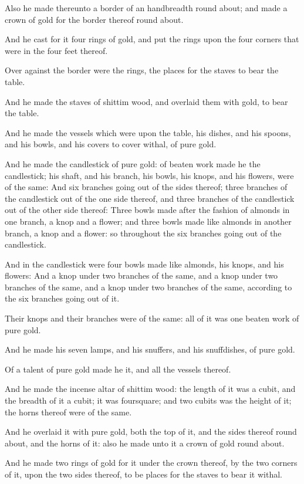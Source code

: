 \verse Also he made thereunto a border of an handbreadth round about; and made a crown of gold for the border thereof round about.

\verse And he cast for it four rings of gold, and put the rings upon the four corners that were in the four feet thereof.

\verse Over against the border were the rings, the places for the staves to bear the table.

\verse And he made the staves of shittim wood, and overlaid them with gold, to bear the table.

\verse And he made the vessels which were upon the table, his dishes, and his spoons, and his bowls, and his covers to cover withal, of pure gold.

\verse And he made the candlestick of pure gold: of beaten work made he the candlestick; his shaft, and his branch, his bowls, his knops, and his flowers, were of the same: \verse And six branches going out of the sides thereof; three branches of the candlestick out of the one side thereof, and three branches of the candlestick out of the other side thereof: \verse Three bowls made after the fashion of almonds in one branch, a knop and a flower; and three bowls made like almonds in another branch, a knop and a flower: so throughout the six branches going out of the candlestick.

\verse And in the candlestick were four bowls made like almonds, his knops, and his flowers: \verse And a knop under two branches of the same, and a knop under two branches of the same, and a knop under two branches of the same, according to the six branches going out of it.

\verse Their knops and their branches were of the same: all of it was one beaten work of pure gold.

\verse And he made his seven lamps, and his snuffers, and his snuffdishes, of pure gold.

\verse Of a talent of pure gold made he it, and all the vessels thereof.

\verse And he made the incense altar of shittim wood: the length of it was a cubit, and the breadth of it a cubit; it was foursquare; and two cubits was the height of it; the horns thereof were of the same.

\verse And he overlaid it with pure gold, both the top of it, and the sides thereof round about, and the horns of it: also he made unto it a crown of gold round about.

\verse And he made two rings of gold for it under the crown thereof, by the two corners of it, upon the two sides thereof, to be places for the staves to bear it withal.

